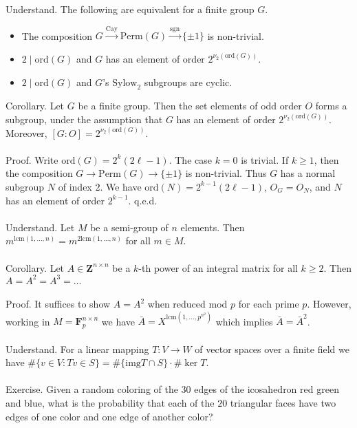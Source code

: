 \documentclass[english]{article}
\renewcommand\to{\longrightarrow}
\def\Z{\mathbf{Z}}
\def\F{\mathbf{F}}
\newcommand\syl[1]{$\text{Sylow}_{#1}$}
\def\ord{\text{ord}}
\def\lcm{\text{lcm}}
\def\perm{\text{Perm}}
\def\cay{\text{Cay}}
\def\sgn{\text{sgn}}
\newcommand\set[1]{\{#1\}}
\def\img{\text{img}}
\begin{document}
Understand. The following are equivalent for a finite group $G$.
\begin{itemize}
\item The composition $G\xrightarrow{\cay}\perm(G)\xrightarrow{\sgn}\{\pm1\}$ is non-trivial.
\item $2\mid \ord(G)$ and $G$ has an element of order $2^{\nu_2(\ord(G))}$.
\item $2\mid \ord(G)$ and $G$'s \syl{2} subgroups are cyclic.
\\
\end{itemize} 
Corollary. Let $G$ be a finite group. Then the set elements of odd order $O$ forms a subgroup, under the assumption that $G$ has an element of order $2^{\nu_2(\ord(G))}$. Moreover, $[G:O]=2^{\nu_2(\ord(G))}$.
\\\\
Proof. Write $\ord(G)=2^k(2\ell-1)$. The case $k=0$ is trivial. If $k\ge1$, then the composition $G\to\perm(G)\to\set{\pm1}$ is non-trivial. Thus $G$ has a normal subgroup $N$ of index $2$. We have $\ord(N)=2^{k-1}(2\ell-1)$, $O_G=O_N$, and $N$ has an element of order $2^{k-1}$. q.e.d.
\\\\
Understand. Let $M$ be a semi-group of $n$ elements. Then $m^{\lcm(1,\dots,n)}=m^{2\lcm(1,\dots,n)}$ for all $m\in M$.
\\\\
Corollary. Let $A\in\Z^{n\times n}$ be a $k$-th power of an integral matrix for all $k\ge 2$. Then $A=A^2=A^3=\dots$
\\\\
Proof. It suffices to show $A=A^2$ when reduced mod $p$ for each prime $p$. However, working in $M=\F_p^{n\times n}$ we have $\bar{A}={X}^{\lcm(1,\dots,p^{n^2})}$ which implies $\bar{A}=\bar{A}^2$.
\\\\
Understand. For a linear mapping $T:V\to W$ of vector spaces over a finite field we have $\#\{v\in V: Tv\in S\}=\#\{\img T\cap S\}\cdot \#\ker T$.
\\\\
Exercise. Given a random coloring of the $30$ edges of the icosahedron red green and blue, what is the probability that each of the $20$ triangular faces have two edges of one color and one edge of another color?
\\\\
\end{document}
